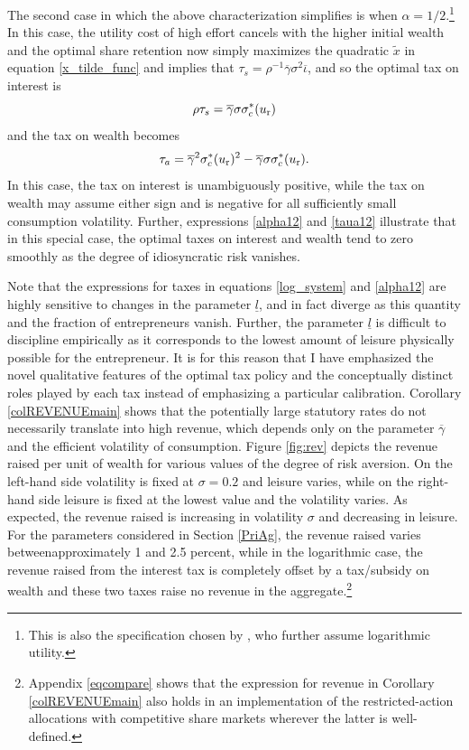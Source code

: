 \documentclass[11pt]{article}
\theoremstyle{plain}
\begin{document}
The second case in which the above characterization simplifies is when $\alpha=1/2$.\footnote{This is also the specification chosen by \cite{jones_schumpeterian_2018}, who further assume logarithmic utility.} In this case, the utility cost of high effort cancels with the higher initial wealth and the optimal share retention now simply maximizes the quadratic $\tilde{x}$ in equation \eqref{x_tilde_func} and implies that $\tau_s = \rho^{-1} \overline{\gamma} \sigma^2 \overline{\iota}$, and so the optimal tax on interest is
\begin{equation} 
\rho \tau_s = \overline{\gamma} \sigma \sigma_c^*(u_{\textnormal{r}})
\label{alpha12}
\end{equation} 
and the tax on wealth becomes
\begin{equation}
\tau_a = \overline{\gamma}^2 \sigma_c^*(u_{\textnormal{r}})^2 - \overline{\gamma} \sigma \sigma_c^*(u_{\textnormal{r}}).
\label{taua12}
\end{equation}
In this case, the tax on interest is unambiguously positive, while the tax on wealth may assume either sign and is negative for all sufficiently small consumption volatility. Further, expressions \eqref{alpha12} and \eqref{taua12} illustrate that in this special case, the optimal taxes on interest and wealth tend to zero smoothly as the degree of idiosyncratic risk vanishes. 

Note that the expressions for taxes in equations \eqref{log_system} and \eqref{alpha12} are highly sensitive to changes in the parameter $\underline{l}$, and in fact diverge as this quantity and the fraction of entrepreneurs vanish. Further, the parameter $\underline{l}$ is difficult to discipline empirically as it corresponds to the lowest amount of leisure physically possible for the entrepreneur. It is for this reason that I have emphasized the novel qualitative features of the optimal tax policy and the conceptually distinct roles played by each tax instead of emphasizing a particular calibration. Corollary \ref{colREVENUEmain} shows that the potentially large statutory rates do not necessarily translate into high revenue, which depends only on the parameter $\overline{\gamma}$ and the efficient volatility of consumption. Figure \ref{fig:rev} depicts the revenue raised per unit of wealth for various values of the degree of risk aversion. On the left-hand side volatility is fixed at $\sigma=0.2$ and leisure varies, while on the right-hand side leisure is fixed at the lowest value and the volatility varies. As expected, the revenue raised is increasing in volatility $\sigma$ and decreasing in leisure. For the parameters considered in Section \ref{PriAg}, the revenue raised varies betweenapproximately 1 and 2.5 percent, while in the logarithmic case, the revenue raised from the interest tax is completely offset by a tax/subsidy on wealth and these two taxes raise no revenue in the aggregate.\footnote{Appendix \ref{eqcompare} shows that the expression for revenue in Corollary \ref{colREVENUEmain} also holds in an implementation of the restricted-action allocations with competitive share markets wherever the latter is well-defined.}
\end{document}
